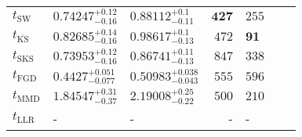 \begin{tabular}{l|llr|llr}
	\midrule
	$t_{\mathrm{SW}}$ & $0.74247_{-0.16}^{+0.12}$ & $0.88112_{-0.11}^{+0.1}$ & ${\mathbf{427}}$ & $255$ \\
	$t_{\overline{\mathrm{KS}}}$ & $0.82685_{-0.16}^{+0.14}$ & $0.98617_{-0.13}^{+0.1}$ & $472$ & ${\mathbf{91}}$ \\
	$t_{\mathrm{SKS}}$ & $0.73953_{-0.16}^{+0.12}$ & $0.86741_{-0.13}^{+0.11}$ & $847$ & $338$ \\
	$t_{\mathrm{FGD}}$ & ${\mathbf{0.4427_{-0.077}^{+0.051}}}$ & ${\mathbf{0.50983_{-0.043}^{+0.038}}}$ & $555$ & $596$ \\
	$t_{\mathrm{MMD}}$ & $1.84547_{-0.37}^{+0.31}$ & $2.19008_{-0.22}^{+0.25}$ & $500$ & $210$ \\
	$t_{\mathrm{LLR}}$ & - & - & - & - \\
	\bottomrule
\end{tabular}
